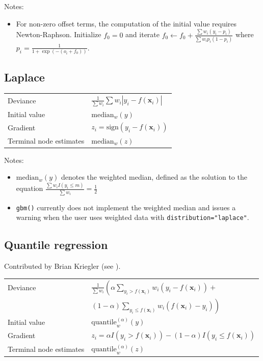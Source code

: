 \documentclass{article}
\begin{document}
Notes: \begin{itemize} \item For non-zero offset terms, the computation of the initial value requires Newton-Raphson. Initialize $f_0=0$ and iterate $\displaystyle f_0 \leftarrow f_0 + \frac{\sum w_i(y_i-p_i)}{\sum w_ip_i(1-p_i)}$ where $\displaystyle p_i = \frac{1}{1+\exp(-(o_i+f_0))}$. \end{itemize}

\subsection{Laplace}

\begin{tabular}{ll} Deviance & $\frac{1}{\sum w_i} \sum w_i|y_i-f(\mathbf{x}_i)|$ \\ Initial value & $\mbox{median}_w(y)$ \\ Gradient & $z_i=\mbox{sign}(y_i-f(\mathbf{x}_i))$ \\ Terminal node estimates & $\mbox{median}_w(z)$ \end{tabular}

Notes: \begin{itemize} \item $\mbox{median}_w(y)$ denotes the weighted
  median, defined as the solution to the equation $\frac{\sum
    w_iI(y_i\leq m)}{\sum w_i}=\frac{1}{2}$ \item \texttt{gbm()}
  currently does not implement the weighted median and issues a
  warning when the user uses weighted data with
  \texttt{distribution="laplace"}. \end{itemize}


\subsection{Quantile regression}

Contributed by Brian Kriegler (see \cite{Kriegler:2010}).

\begin{tabular}{ll} Deviance & $\frac{1}{\sum w_i}
   \left(\alpha\sum_{y_i>f(\mathbf{x}_i)} w_i(y_i-f(\mathbf{x}_i))\right. +$ \\
         & \hspace{0.5in}$\left.(1-\alpha)\sum_{y_i\leq f(\mathbf{x}_i)} w_i(f(\mathbf{x}_i)-y_i)\right)$ \\
Initial value & $\mathrm{quantile}^{(\alpha)}_w(y)$ \\ Gradient & $z_i=\alpha I(y_i>f(\mathbf{x}_i))-(1-\alpha)I(y_i\leq f(\mathbf{x}_i))$ \\ Terminal node estimates & $\mathrm{quantile}^{(\alpha)}_w(z)$ \end{tabular}
\end{document}
